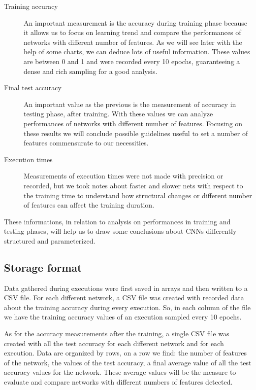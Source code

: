 \begin{description}
	\item[Training accuracy] An important measurement is the accuracy during training phase because it allows us to focus on learning trend and compare the performances of networks with different number of features. As we will see later with the help of some charts, we can deduce lots of useful information. These values are between 0 and 1 and were recorded every 10 epochs, guaranteeing a dense and rich sampling for a good analysis.
	
	\item[Final test accuracy] An important value as the previous is the measurement of accuracy in testing phase, after training. With these values we can analyze performances of networks with different number of features. Focusing on these results we will conclude possible guidelines useful to set a number of features commensurate to our necessities.
	
	\item[Execution times] Measurements of execution times were not made with precision or recorded, but we took notes about faster and slower nets with respect to the training time to understand how structural changes or different number of features can affect the training duration.
\end{description}

These informations, in relation to analysis on performances in training and testing phases, will help us to draw some conclusions about \acsp{CNN} differently structured and parameterized.

\subsection{Storage format}

Data gathered during executions were first saved in arrays and then written to a CSV file. For each different network, a CSV file was created with recorded data about the training accuracy during every execution. So, in each column of the file we have the training accuracy values of an execution sampled every 10 epochs.

As for the accuracy measurements after the training, a single CSV file was created with all the test accuracy for each different network and for each execution. Data are organized by rows, on a row we find: the number of features of the network, the values of the test accuracy, a final average value of all the test accuracy values for the network. These average values will be the measure to evaluate and compare networks with different numbers of features detected.

